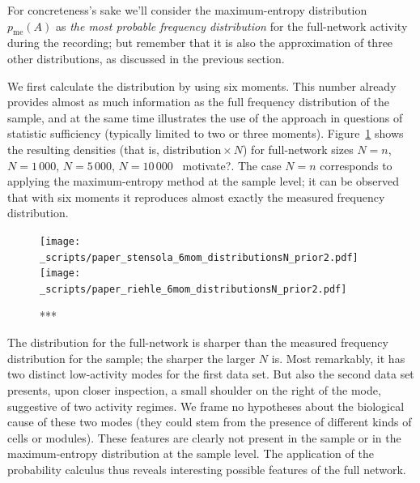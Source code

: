 \documentclass[\ifafour a4paper,12pt,\else a5paper,10pt,\fi%
onecolumn,oneside,article,%
british%
]{memoir}
\theoremstyle{remark}
\theoremstyle{innote}
\renewcommand*{\|}{\nonscript\,\vert\nonscript\;\mathopen{}}
\newcommand*{\puzzle}{{\fontencoding{U}\fontfamily{fontawesometwo}\selectfont\symbol{225}}}
\newcommand{\mynote}[1]{ {\color{notecolour}\puzzle\ #1}}
\newcommand*{\yAv}{A}
\newcommand*{\yA}{\yAv}%
\newcommand*{\px}{p_{\text{me}}}
\begin{document}
For concreteness's sake we'll consider the maximum-entropy distribution
$\px(\yA)$ as \emph{the most probable frequency distribution} for the
full-network activity during the recording; but remember that it is also
the approximation of three other distributions, as discussed in the
previous section.

\bigskip

We first calculate the distribution by using six moments. This number
already provides almost as much information as the full frequency
distribution of the sample, and at the same time illustrates the use of the
approach in questions of statistic sufficiency (typically limited to two or
three moments). Figure~\ref{fig:plots_6mom} shows the resulting densities
(that is, distribution${}\times N$) for full-network sizes $N=n$,
$N=1\,000$, $N=5\,000$, $N=10\,000$\mynote{motivate?}. The case $N=n$
corresponds to applying the maximum-entropy method at the sample level; it
can be observed that with six moments it reproduces almost exactly the
measured frequency distribution.
\begin{figure}[!p]
\centering
\texttt{[image: \_scripts/paper\_stensola\_6mom\_distributionsN\_prior2.pdf]}%
\\[3em]%
\texttt{[image: \_scripts/paper\_riehle\_6mom\_distributionsN\_prior2.pdf]}%
\caption{***}
\label{fig:plots_6mom}
\end{figure}


The distribution for the full-network is sharper than the measured
frequency distribution for the sample; the sharper the larger $N$ is. Most
remarkably, it has two distinct low-activity modes for the first data set.
But also the second data set presents, upon closer inspection, a small
shoulder on the right of the mode, suggestive of two activity regimes. We
frame no hypotheses about the biological cause of these two modes (they
could stem from the presence of different kinds of cells or modules). These
features are clearly not present in the sample or in the maximum-entropy
distribution at the sample level. The application of the probability
calculus thus reveals interesting possible features of the full network.

\bigskip
\end{document}
